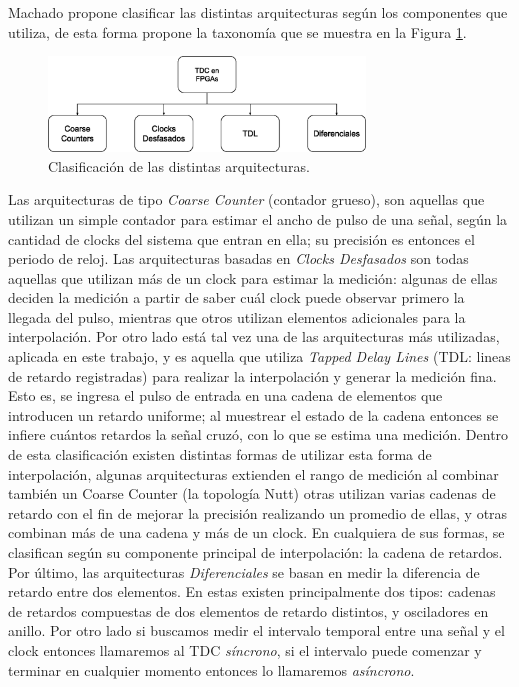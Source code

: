 Machado propone clasificar las distintas arquitecturas según los componentes que utiliza, de esta forma propone la taxonomía que
se muestra en la Figura \ref{fig: taxonomia}.
\begin{figure}[H]
     \centering
     \includegraphics[width=0.75\textwidth]{imagenes/taxonomia.eps}
     \caption{Clasificación de las distintas arquitecturas.}
     \label{fig: taxonomia}
\end{figure}
Las arquitecturas de tipo \textit{Coarse Counter} (contador grueso), son aquellas que utilizan 
un simple contador para estimar el ancho de pulso de una señal, según la cantidad de clocks del 
sistema que entran en ella; su precisión es entonces el periodo de reloj. Las arquitecturas basadas 
en \textit{Clocks Desfasados} son todas aquellas que utilizan más de un clock para estimar la medición:
algunas de ellas deciden la medición a partir de saber cuál clock puede observar primero la llegada del pulso, 
mientras que otros utilizan elementos adicionales para la interpolación. 
Por otro lado está tal vez una de las arquitecturas más utilizadas, aplicada en este trabajo, y es aquella 
que utiliza \textit{Tapped Delay Lines} (TDL: lineas de retardo registradas) para realizar la interpolación y 
generar la medición fina. Esto es, se ingresa el pulso de entrada en una cadena de elementos que introducen un 
retardo uniforme; al muestrear el estado de la cadena entonces se infiere cuántos retardos la señal cruzó, con lo 
que se estima una medición. Dentro de esta clasificación existen distintas formas de utilizar esta forma de 
interpolación, algunas arquitecturas extienden el rango de medición al combinar también un Coarse Counter (la
topología Nutt) otras utilizan varias cadenas de retardo con el fin de mejorar la precisión realizando un 
promedio de ellas, y otras combinan más de una cadena y más de un clock. En cualquiera de sus formas, se 
clasifican según su componente principal de interpolación:
la cadena de retardos. Por último, las arquitecturas \textit{Diferenciales} se basan en medir la diferencia 
de retardo entre dos elementos. En estas existen principalmente dos tipos: cadenas de retardos compuestas de 
dos elementos de retardo distintos, y osciladores en anillo.
Por otro lado si buscamos medir el intervalo temporal entre una señal y el clock entonces llamaremos al TDC 
\textit{síncrono}, si el intervalo puede comenzar y terminar en cualquier momento entonces lo llamaremos 
\textit{asíncrono}.\\

